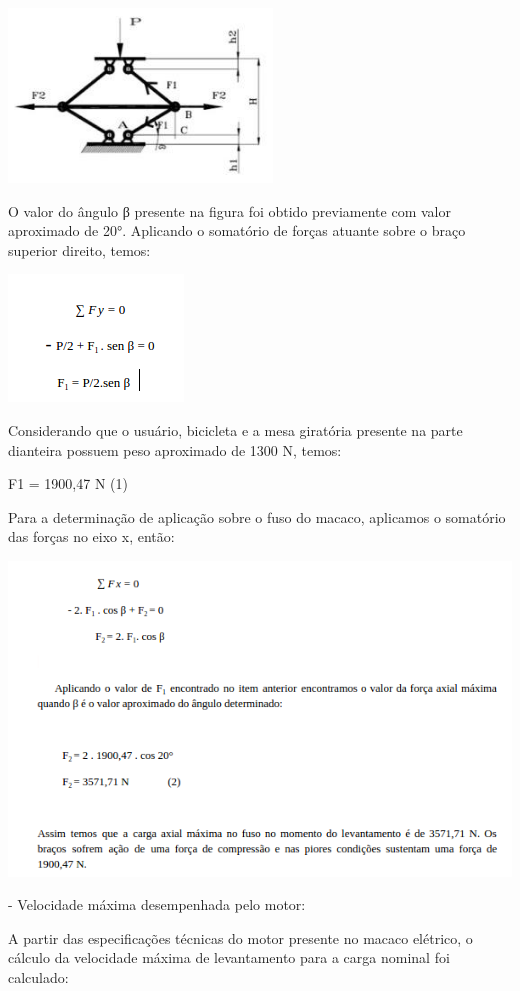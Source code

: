                             
 \begin{center}
    	\includegraphics[scale=0.7]{figuras/item}
        \label{item}
    \end{center}

O valor do ângulo β presente na figura foi obtido previamente com valor aproximado de 20°. Aplicando o somatório de forças atuante sobre o braço superior direito, temos:
              \begin{center}
    	\includegraphics[scale=0.7]{figuras/f1}
                \label{f1}
    \end{center}

Considerando que o usuário, bicicleta e a mesa giratória presente na parte dianteira possuem peso aproximado de 1300 N, temos: 

          F1 = 1900,47 N       (1) 

Para a determinação de aplicação sobre o fuso do macaco, aplicamos o somatório das forças no eixo x, então: 

                       \begin{center}
    	\includegraphics[scale=0.7]{figuras/f2}
                \label{f2}
    \end{center}
 \item 
- Velocidade máxima desempenhada pelo motor: 
 \item 
 A partir das especificações técnicas do motor presente no macaco elétrico, o cálculo da velocidade máxima de levantamento para a carga nominal foi calculado: 
 


